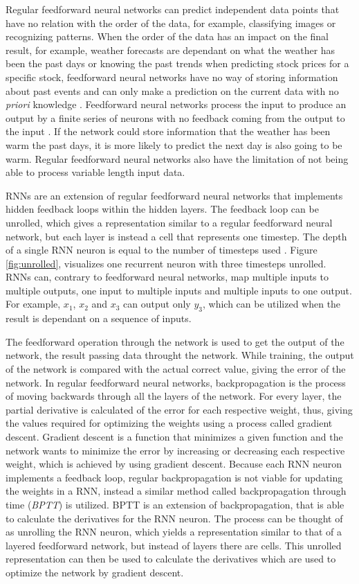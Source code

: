\documentclass[../main.tex]{subfiles}
\begin{document}
Regular feedforward neural networks can predict independent data points that have no relation with the order of the data, for example, classifying images or recognizing patterns. When the order of the data has an impact on the final result, for example, weather forecasts are dependant on what the weather has been the past days or knowing the past trends when predicting stock prices for a specific stock, feedforward neural networks have no way of storing information about past events and can only make a prediction on the current data with no \textit{priori} knowledge \cite{Dipietro_2020, Gupta_2019, Kumara_2021}. Feedforward neural networks process the input to produce an output by a finite series of neurons with no feedback coming from the output to the input \cite{Gurney_1997}. If the network could store information that the weather has been warm the past days, it is more likely to predict the next day is also going to be warm. Regular feedforward neural networks also have the limitation of not being able to process variable length input data.

RNNs are an extension of regular feedforward neural networks that implements hidden  feedback loops within the hidden layers. The feedback loop can be unrolled, which gives a representation similar to a regular feedforward neural network, but each layer is instead a cell that represents one timestep. The depth of a single RNN neuron is equal to the number of timesteps used \cite{di_2018}. Figure \ref{fig:unrolled}, visualizes one recurrent neuron with three timesteps unrolled. RNNs can, contrary to feedforward neural networks, map multiple inputs to multiple outputs, one input to multiple inputs and multiple inputs to one output. For example, $x_1$, $x_2$ and $x_3$ can output only $y_3$, which can be utilized when the result is dependant on a sequence of inputs.

The feedforward operation through the network is used to get the output of the network, the result passing data throught the network. While training, the output of the network is compared with the actual correct value, giving the error of the network. In regular feedforward neural networks, backpropagation is the process of moving backwards through all the layers of the network. For every layer, the partial derivative is calculated of the error for each respective weight, thus, giving the values required for optimizing the weights using a process called gradient descent. Gradient descent is a function that minimizes a given function and the network wants to minimize the error by increasing or decreasing each respective weight, which is achieved by using gradient descent. Because each RNN neuron implements a feedback loop, regular backpropagation is not viable for updating the weights in a RNN, instead a similar method called backpropagation through time (\textit{BPTT}) is utilized. BPTT is an extension of backpropagation, that is able to calculate the derivatives for the RNN neuron. The process can be thought of as unrolling the RNN neuron, which yields a representation similar to that of a layered feedforward network, but instead of layers there are cells. This unrolled representation can then be used to calculate the derivatives which are used to optimize the network by gradient descent.
\end{document}
